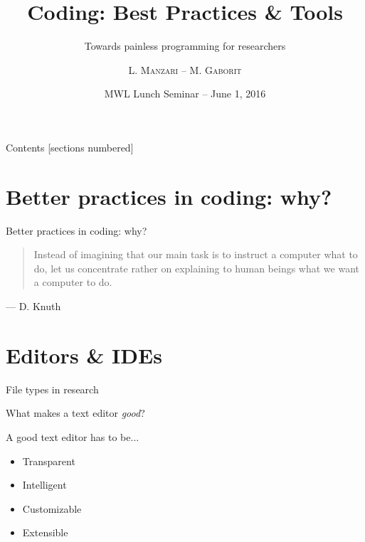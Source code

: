 \documentclass[10pt]{beamer}
\title{Coding: Best Practices \& Tools}
\subtitle{Towards painless programming for researchers}
\author{L. \textsc{Manzari} -- M. \textsc{Gaborit}}
\date{MWL Lunch Seminar -- June 1, 2016}
\institute{}
\newcommand\fileimage[1]{%
	\draw[fill=black!2] (#1) -- ++(2,0) -- ++(0,2.5) -- ++(-1.5,0) -- ++(-.5,-.5) -- cycle;
}
\begin{document}
\maketitle

\begin{frame}{Contents}
	[sections numbered]
	\tableofcontents[hideallsubsections]
\end{frame}

\section{Better practices in coding: why?} %

\begin{frame}{Better practices in coding: why?}

	\begin{quotation}
		Instead of imagining that our main task is to instruct a
		computer what to do, let us concentrate rather on explaining to human
		beings what we want a computer to do.
	\end{quotation}
	\begin{flushright}
		--- D. Knuth
	\end{flushright}

\end{frame}

\section{Editors \& IDEs} %

\begin{frame}{File types in research} %

	\begin{center}
		\pause{}


	\end{center}
\end{frame}

\begin{frame}{What makes a text editor \emph{good}?} %

	\large
	A good text editor has to be...
		\begin{itemize}
			\item Transparent
			\item Intelligent
			\item Customizable
			\item Extensible
		\end{itemize}

\end{frame}
\end{document}
